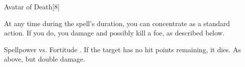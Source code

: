\begin{spellsection}{Avatar of Death}[8]
    \begin{spellheader}
    \end{spellheader}
    \begin{spellcontent}
        \begin{spelltargetinginfo}
        \end{spelltargetinginfo}
        \begin{spelleffects}
            \spelleffect At any time during the spell's duration, you can concentrate as a standard action. If you do, you damage and possibly kill a foe, as described below.
            \spelldur \durlong
        \end{spelleffects}
    \end{spellcontent}
    \begin{spellsubcontent}
        \begin{spelltargetinginfo}
        \end{spelltargetinginfo}
        \begin{spelleffects}
            \begin{spellattack}{Spellpower vs. Fortitude}
                \spellsuccess {}. If the target has no hit points remaining, it dies.
                \spellcritical As above, but double damage.
            \end{spellattack}
        \end{spelleffects}
    \end{spellsubcontent}
    \begin{spellfooter}
        \miscastexplode
    \end{spellfooter}
    \begin{spellaugments}
    \end{spellaugments}
\end{spellsection}

